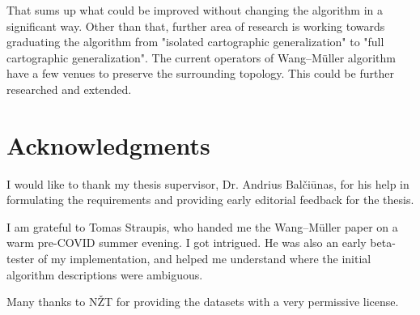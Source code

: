 \documentclass[a4paper]{article}
\newcommand{\WM}{Wang--M{\"u}ller}
\begin{document}
That sums up what could be improved without changing the algorithm in a
significant way. Other than that, further area of research is working towards
graduating the algorithm from "isolated cartographic generalization" to "full
cartographic generalization".  The current operators of {\WM} algorithm have a
few venues to preserve the surrounding topology. This could be further
researched and extended.

\section{Acknowledgments}
\label{sec:acknowledgments}

I would like to thank my thesis supervisor, Dr. Andrius Balčiūnas, for his help
in formulating the requirements and providing early editorial feedback for the
thesis.

I am grateful to Tomas Straupis, who handed me the {\WM}\cite{wang1998line}
paper on a warm pre-COVID summer evening. I got intrigued. He was also an early
beta-tester of my implementation, and helped me understand where the initial
algorithm descriptions were ambiguous.

Many thanks to NŽT\cite{nzt} for providing the datasets with a very permissive
license.

\printbibliography
\end{document}
